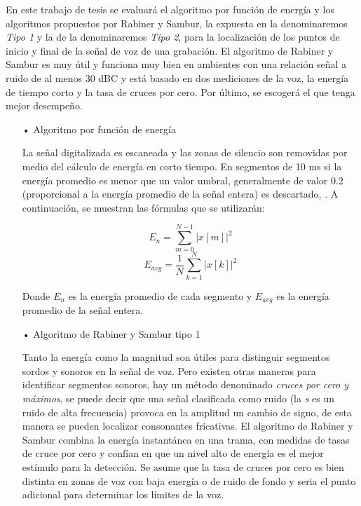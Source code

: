 \begin{enumerate}
En este trabajo de tesis se evaluará el algoritmo por función de energía y los algoritmos propuestos por Rabiner y Sambur, la expuesta en \citep{unam} la denominaremos \textit{Tipo 1} y la de \citep{rabiner} la denominaremos \textit{Tipo 2}, para la localización de los puntos de inicio y final de la señal de voz de una grabación. El algoritmo de Rabiner y Sambur es muy útil y funciona muy bien en ambientes con una relación señal a ruido de al menos 30 dBC y está basado en dos mediciones de la voz, la energía de tiempo corto y la tasa de cruces por cero. Por último, se escogerá el que tenga mejor desempeño.

\begin{enumerate}
\item[•]Algoritmo por función de energía
\par
La señal digitalizada es escaneada y las zonas de silencio son removidas por medio del cálculo de energía en corto tiempo. En segmentos de 10 ms si la energía promedio es menor que un valor umbral, generalmente de valor 0.2 (proporcional a la energía promedio de la señal entera) es descartado, \cite{genoveva}. A continuación, se muestran las fórmulas que se utilizarán:

\begin{equation}
\label{eq:ecuacion17}
E_{n} = \sum_{m=0}^{N-1}\left | x[m] \right |^{2}
\end{equation}
\vskip -0.5cm
\begin{equation}
\label{eq:ecuacion18}
E_{avg} = \frac{1}{N}\sum_{k=1}^{N}\left | x[k] \right |^{2}
\end{equation}

Donde $E_{n}$ es la energía promedio de cada segmento y $E_{avg}$ es la energía promedio de la señal entera.

\item[•]Algoritmo de Rabiner y Sambur tipo 1
\par
Tanto la energía como la magnitud son útiles para distinguir segmentos sordos y sonoros en la señal de voz. Pero existen otras maneras para identificar segmentos sonoros, hay un método denominado \textit{cruces por cero y máximos}, se puede decir que una señal clasificada como ruido (la \textit{s} es un ruido de alta frecuencia) provoca en la amplitud un cambio de signo, de esta manera se pueden localizar consonantes fricativas.
\vskip 0.5cm
El algoritmo de Rabiner y Sambur combina la energía instantánea en una trama, con medidas de tasas de cruce por cero y confían en que un nivel alto de energía es el mejor estímulo para la detección. Se asume que la tasa de cruces por cero es bien distinta en zonas de voz con baja energía o de ruido de fondo y seria el punto adicional para determinar los límites de la voz.


\end{enumerate}
\end{enumerate}
